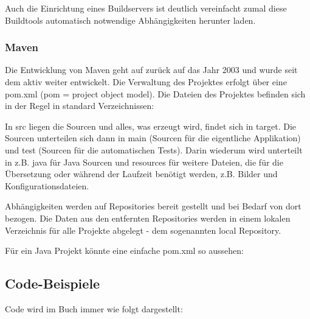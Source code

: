 Auch die Einrichtung eines Buildservers ist deutlich vereinfacht zumal diese Buildtools automatisch notwendige Abhängigkeiten herunter laden.

\subsubsection{Maven}

Die Entwicklung von Maven geht auf zurück auf das Jahr 2003 und wurde seit dem aktiv weiter entwickelt. Die Verwaltung des Projektes erfolgt über eine pom.xml (pom = project object model). Die Dateien des Projektes befinden sich in der Regel in standard Verzeichnissen:

In src liegen die Sourcen und alles, was erzeugt wird, findet sich in target. Die Sourcen unterteilen sich dann in main (Sourcen für die eigentliche Applikation) und test (Sourcen für die automatischen Tests). Darin wiederum wird unterteilt in z.B. java für Java Sourcen und resources für weitere Dateien, die für die Übersetzung oder während der Laufzeit benötigt werden, z.B. Bilder und Konfigurationsdateien.

Abhängigkeiten werden auf Repositories bereit gestellt und bei Bedarf von dort bezogen. Die Daten aus den entfernten Repositories werden in einem lokalen Verzeichnis für alle Projekte abgelegt - dem sogenannten local Repository.

Für ein Java Projekt könnte eine einfache pom.xml so aussehen:
\subsection{Code-Beispiele}
Code wird im Buch immer wie folgt dargestellt:

